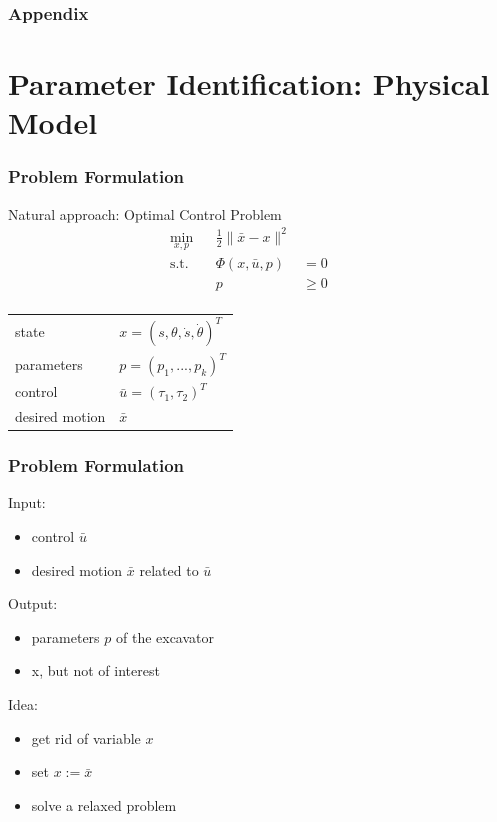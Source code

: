 \documentclass[table]{beamer}
\begin{document}
\begin{frame}[c]
	\frametitle{Appendix}
\end{frame}

\section{Parameter Identification: Physical Model}

\begin{frame}
    \frametitle{Problem Formulation}
    Natural approach: Optimal Control Problem
    \begin{align*}
        \min_{x,p} & & \frac{1}{2} \| \bar{x} - x \|^2 & & \\
        \operatorname{s.t.} & & \Phi(x,\bar{u},p) & = 0 & & \\
                            & & p & \geq 0 & & \\
    \end{align*}

    \begin{tabular}{ll}
        state & $ x = (s,\theta,\dot{s},\dot{\theta})^T $ \\
        parameters & $ p = (p_1,...,p_k)^T $ \\
        control & $ \bar{u} = (\tau_1,\tau_2)^T $ \\
        desired motion & $\bar{x}$ \\
    \end{tabular}
\end{frame}

\begin{frame}
    \frametitle{Problem Formulation}

    Input:
    \begin{itemize}
        \item{control $\bar{u}$}
        \item{desired motion $\bar{x}$ related to $\bar{u}$}
    \end{itemize}
		
    Output:
    \begin{itemize}
        \item{parameters $p$ of the excavator}
        \item{x, but not of interest}
    \end{itemize}

    Idea:
    \begin{itemize}
        \item{get rid of variable $x$}
        \item{set $x := \bar{x}$}
        \item{solve a relaxed problem}
    \end{itemize}
\end{frame}
\end{document}
